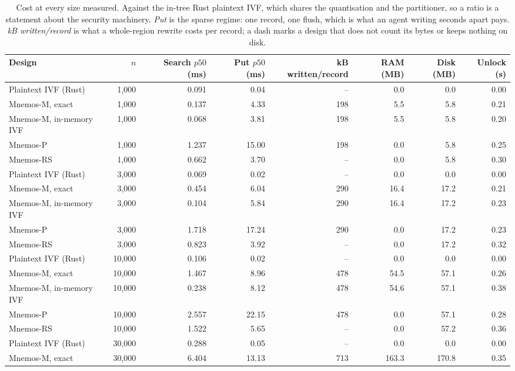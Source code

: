 \begin{table}[t]
\centering
\caption{Cost at every size measured. Against the in-tree Rust plaintext IVF, which shares the quantisation and the partitioner, so a ratio is a statement about the security machinery. \emph{Put} is the sparse regime: one record, one flush, which is what an agent writing seconds apart pays. \emph{kB written/record} is what a whole-region rewrite costs per record; a dash marks a design that does not count its bytes or keeps nothing on disk.}
\label{tab:supp-e10}
\footnotesize
\setlength{\tabcolsep}{4pt}
\begin{tabular}{lrrrrrrr}
\toprule
Design & $n$ & Search $p50$ (ms) & Put $p50$ (ms) & kB written/record & RAM (MB) & Disk (MB) & Unlock (s) \\
\midrule
Plaintext IVF (Rust) & 1,000 & 0.091 & 0.04 & -- & 0.0 & 0.0 & 0.00 \\
Mnemos-M, exact & 1,000 & 0.137 & 4.33 & 198 & 5.5 & 5.8 & 0.21 \\
Mnemos-M, in-memory IVF & 1,000 & 0.068 & 3.81 & 198 & 5.5 & 5.8 & 0.20 \\
Mnemos-P & 1,000 & 1.237 & 15.00 & 198 & 0.0 & 5.8 & 0.25 \\
Mnemos-RS & 1,000 & 0.662 & 3.70 & -- & 0.0 & 5.8 & 0.30 \\
Plaintext IVF (Rust) & 3,000 & 0.069 & 0.02 & -- & 0.0 & 0.0 & 0.00 \\
Mnemos-M, exact & 3,000 & 0.454 & 6.04 & 290 & 16.4 & 17.2 & 0.21 \\
Mnemos-M, in-memory IVF & 3,000 & 0.104 & 5.84 & 290 & 16.4 & 17.2 & 0.23 \\
Mnemos-P & 3,000 & 1.718 & 17.24 & 290 & 0.0 & 17.2 & 0.23 \\
Mnemos-RS & 3,000 & 0.823 & 3.92 & -- & 0.0 & 17.2 & 0.32 \\
Plaintext IVF (Rust) & 10,000 & 0.106 & 0.02 & -- & 0.0 & 0.0 & 0.00 \\
Mnemos-M, exact & 10,000 & 1.467 & 8.96 & 478 & 54.5 & 57.1 & 0.26 \\
Mnemos-M, in-memory IVF & 10,000 & 0.238 & 8.12 & 478 & 54.6 & 57.1 & 0.38 \\
Mnemos-P & 10,000 & 2.557 & 22.15 & 478 & 0.0 & 57.1 & 0.28 \\
Mnemos-RS & 10,000 & 1.522 & 5.65 & -- & 0.0 & 57.2 & 0.36 \\
Plaintext IVF (Rust) & 30,000 & 0.288 & 0.05 & -- & 0.0 & 0.0 & 0.00 \\
Mnemos-M, exact & 30,000 & 6.404 & 13.13 & 713 & 163.3 & 170.8 & 0.35 \\

\end{tabular}
\end{table}
